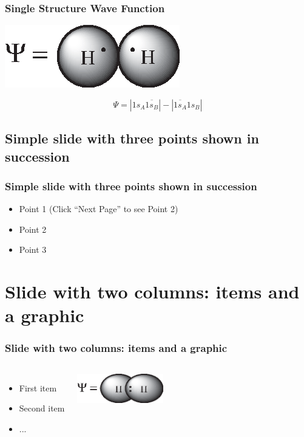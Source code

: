 \documentclass[]{beamer}
\begin{document}
\begin{frame}
  \frametitle{Single Structure Wave Function}
  \begin{center}
  \includegraphics{../figures/heitler.eps}  
  \end{center}
  \begin{equation*}
    \Psi = |1s_{A}\overline{1s_{B}}| - |\overline{1s_{A}}1s_{B}|
  \end{equation*}
\end{frame}

\subsection{Simple slide with three points shown in succession}

\begin{frame}
  \frametitle{Simple slide with three points shown in succession}   %

  \begin{itemize}
  \item<1-> Point 1 (Click ``Next Page'' to see Point 2) %
  \item<2-> Point 2  %
  \item<3-> Point 3
  \end{itemize}
\end{frame}

\section{Slide with two columns: items and a graphic}
\begin{frame}
  \frametitle{Slide with two columns: items and a graphic}   %
  \begin{columns}[c]
  \column{2in}  %
  \begin{itemize}
  \item<1-> First item
  \item<2-> Second item
  \item<3-> ...
  \end{itemize}
  \column{2in}
  \includegraphics[height=0.5in]{../figures/coulson.eps}
  \end{columns}
\end{frame}
\end{document}
